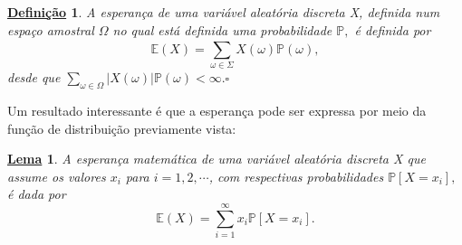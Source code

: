 \documentclass{article}
\newtheorem*{def*}{\underline{Defini\c c\~ao}}
\newtheorem*{lemma*}{\underline{Lema}}
\begin{document}
\begin{def*}
  A esperança de uma variável aleatória discreta X, definida num espaço amostral \(\Omega \) no qual está definida uma
probabilidade \(\mathbb{P},\) é definida por 
  \[
    \mathbb{E}(X) = \sum\limits_{\omega \in \Sigma }^{}X(\omega )\mathbb{P}(\omega ),
  \]
desde que \(\sum\limits_{\omega \in \Omega }^{}|X(\omega )|\mathbb{P}(\omega ) < \infty. \square\)
\end{def*}
  Um resultado interessante é que a esperança pode ser expressa por meio da função de distribuição previamente vista:
\begin{lemma*}
  A esperança matemática de uma variável aleatória discreta X que assume os valores \(x_{i}\) para \(i = 1, 2, \cdots\), com
respectivas probabilidades \(\mathbb{P}[X=x_{i}],\) é dada por 
  \[
    \mathbb{E}(X) = \sum\limits_{i=1}^{\infty}x_{i}\mathbb{P}[X=x_{i}].
  \]
\end{lemma*}
\end{document}

